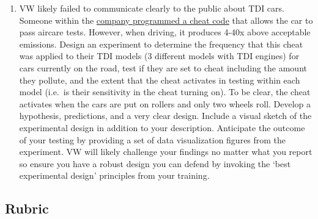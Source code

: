 \documentclass[
]{book}
\begin{document}
\begin{enumerate}
\item
  VW likely failed to communicate clearly to the public about TDI cars. Someone within the \href{https://en.wikipedia.org/wiki/Volkswagen_emissions_scandal}{company programmed a cheat code} that allows the car to pass aircare tests. However, when driving, it produces 4-40x above acceptable emissions. Design an experiment to determine the frequency that this cheat was applied to their TDI models (3 different models with TDI engines) for cars currently on the road, test if they are set to cheat including the amount they pollute, and the extent that the cheat activates in testing within each model (i.e.~is their sensitivity in the cheat turning on). To be clear, the cheat activates when the cars are put on rollers and only two wheels roll. Develop a hypothesis, predictions, and a very clear design. Include a visual sketch of the experimental design in addition to your description. Anticipate the outcome of your testing by providing a set of data visualization figures from the experiment. VW will likely challenge your findings no matter what you report so ensure you have a robust design you can defend by invoking the `best experimental design' principles from your training.
\end{enumerate}

\hypertarget{rubric}{%
\subsection*{Rubric}\label{rubric}}
\end{document}
